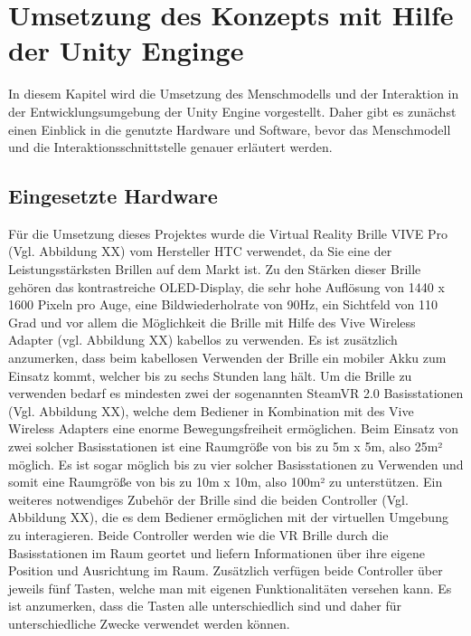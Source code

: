 \chapter{Umsetzung des Konzepts mit Hilfe der Unity Enginge}\label{cha:Umsetzung}
In diesem Kapitel wird die Umsetzung des Menschmodells und der Interaktion in der Entwicklungsumgebung der Unity Engine vorgestellt. Daher gibt es zunächst einen Einblick in die genutzte Hardware und Software, bevor das Menschmodell und die Interaktionsschnittstelle genauer erläutert werden.
\section{Eingesetzte Hardware}\label{sec:Hardware}
Für die Umsetzung dieses Projektes wurde die Virtual Reality Brille VIVE Pro (Vgl. Abbildung XX) vom Hersteller HTC verwendet, da Sie eine der Leistungsstärksten Brillen auf dem Markt ist. Zu den Stärken dieser Brille gehören das kontrastreiche OLED-Display, die sehr hohe Auflösung von 1440 x 1600 Pixeln pro Auge, eine Bildwiederholrate von 90Hz, ein Sichtfeld von 110 Grad und vor allem die Möglichkeit die Brille mit Hilfe des Vive Wireless Adapter (vgl. Abbildung XX) kabellos zu verwenden. Es ist zusätzlich anzumerken, dass beim kabellosen Verwenden der Brille ein mobiler Akku zum Einsatz kommt, welcher bis zu sechs Stunden lang hält.
\newline
Um die Brille zu verwenden bedarf es mindesten zwei der sogenannten SteamVR 2.0 Basisstationen (Vgl. Abbildung XX), welche dem Bediener in Kombination mit des Vive Wireless Adapters eine enorme Bewegungsfreiheit ermöglichen. Beim Einsatz von zwei solcher Basisstationen ist eine Raumgröße von bis zu 5m x 5m, also 25m² möglich. Es ist sogar möglich bis zu vier solcher Basisstationen zu Verwenden und somit eine Raumgröße von bis zu 10m x 10m, also 100m² zu unterstützen.
\newline
Ein weiteres notwendiges Zubehör der Brille sind die beiden Controller (Vgl. Abbildung XX), die es dem Bediener ermöglichen mit der virtuellen Umgebung zu interagieren. Beide Controller werden wie die VR Brille durch die Basisstationen im Raum geortet und liefern Informationen über ihre eigene Position und Ausrichtung im Raum. Zusätzlich verfügen beide Controller über jeweils fünf Tasten, welche man mit eigenen Funktionalitäten versehen kann. Es ist anzumerken, dass die Tasten alle unterschiedlich sind und daher für unterschiedliche Zwecke verwendet werden können. 
